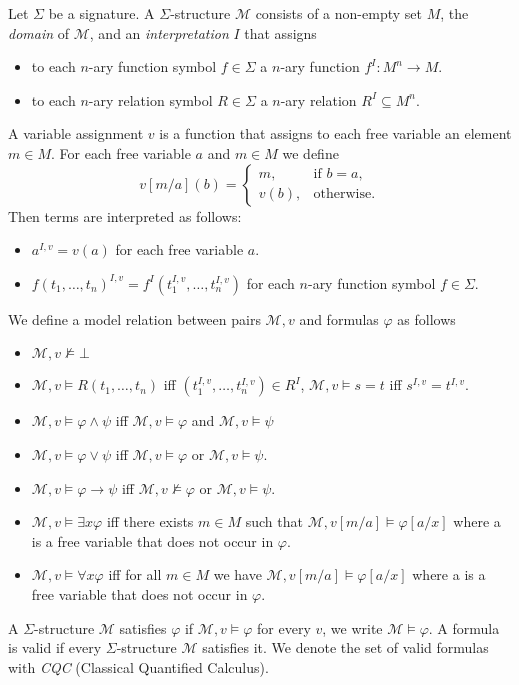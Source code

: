 \documentclass[runningheads]{llncs}
\begin{document}
\begin{definition}
	Let $\Sigma$ be a signature. A $\Sigma$-structure $\mathcal{M}$ consists of a non-empty set $M$, the \emph{domain} of $\mathcal{M}$, and an \emph{interpretation} $I$ that assigns
	\begin{itemize}
		\item to each $n$-ary function symbol $f\in\Sigma$ a $n$-ary function $f^I: M^n\to M$.
		\item to each $n$-ary relation symbol $R\in\Sigma$ a $n$-ary relation $R^I\subseteq M^n$.
	\end{itemize}
	A variable assignment $v$ is a function that assigns to each free variable an element $m\in M$. For each free variable $a$ and $m\in M$ we define $$v[m/a](b) = \begin{cases}
	m, &\text{if $b=a$,}\\
	v(b), &\text{otherwise.}
	\end{cases}$$
	Then terms are interpreted as follows:
	\begin{itemize}
		\item $a^{I, v} = v(a)$ for each free variable $a$.
		\item $f(t_1,\dots,t_n)^{I, v} = f^I(t_1^{I, v},\dots, t_n^{I, v})$ for each $n$-ary function symbol $f\in\Sigma$.
	\end{itemize}
	We define a model relation between pairs $\mathcal M, v$ and formulas $\varphi$ as follows
	\begin{itemize}
		\item $\mathcal M, v\not\models\bot$
		\item $\mathcal M, v\models R(t_1,\dots,t_n)$ iff $(t_1^{I, v},\dots,t_n^{I, v})\in R^I$, $\mathcal M, v\models s = t$ iff $s^{I, v} = t^{I, v}$.
		\item $\mathcal M, v\models \varphi\wedge \psi$ iff $\mathcal M, v\models\varphi$ and $\mathcal M, v\models\psi$
		\item $\mathcal M, v\models \varphi\vee\psi$ iff $\mathcal M, v\models\varphi$ or $\mathcal M, v\models\psi$.
		\item $\mathcal M, v\models \varphi\to\psi$ iff $\mathcal M, v\not\models\varphi$ or $\mathcal M, v\models\psi$.
		\item $\mathcal M, v\models\exists x\varphi$ iff there exists $m\in M$ such that $\mathcal M, v[m/a]\models\varphi[a/x]$ where a is a free variable that does not occur in $\varphi$.
		\item $\mathcal M, v\models\forall x\varphi$ iff for all $m\in M$ we have $\mathcal M, v[m/a]\models\varphi[a/x]$ where a is a free variable that does not occur in $\varphi$.
	\end{itemize}
	A $\Sigma$-structure $\mathcal M$ satisfies $\varphi$ if $\mathcal M, v\models\varphi$ for every $v$, we write $\mathcal M\models\varphi$. A formula is valid if every $\Sigma$-structure $\mathcal M$ satisfies it. We denote the set of valid formulas with \emph{CQC} (Classical Quantified Calculus).
\end{definition}
\end{document}
